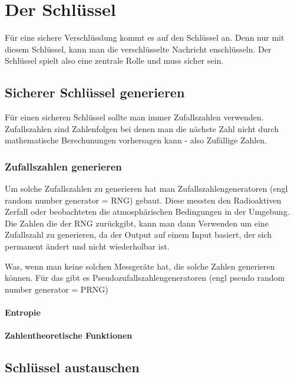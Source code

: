 \section{Der Schlüssel}
Für eine sichere Verschlüsslung kommt es auf den Schlüssel an. Denn nur mit diesem Schlüssel, kann man die verschlüsselte Nachricht enschlüsseln. Der Schlüssel spielt also eine zentrale Rolle und muss sicher sein.

\subsection{Sicherer Schlüssel generieren}
Für einen sicheren Schlüssel sollte man immer Zufallszahlen verwenden. Zufallszahlen sind Zahlenfolgen bei denen man die nächste Zahl nicht durch mathematische Berechunungen vorhersagen kann - also Zufällige Zahlen. 
\subsubsection{Zufallszahlen generieren}
Um solche Zufallszahlen zu generieren hat man Zufallszahlengeneratoren (engl random number generator = RNG) gebaut. Diese messten den Radioaktiven Zerfall oder beobachteten die atmosphärischen Bedingungen in der Umgebung. Die Zahlen die der RNG zurückgibt, kann man dann Verwenden um eine Zufallszahl zu generieren, da der Output auf einem Input basiert, der sich permanent ändert und nicht wiederholbar ist.

Was, wenn man keine solchen Messgeräte hat, die solche Zahlen generieren können. 
Für das gibt es Pseudozufallszahlengeneratoren (engl pseudo random number generator = PRNG)

\paragraph{Entropie}
\paragraph{Zahlentheoretische Funktionen}
\subsection{Schlüssel austauschen}
